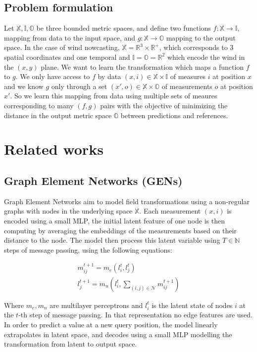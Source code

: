 \documentclass[a4paper,10pt]{article}
\begin{document}
\subsection{Problem formulation}

Let $\mathbb{X}, \mathbb{I}, \mathbb{O}$ be three bounded metric spaces, and define two functions $f : \mathbb{X}\rightarrow \mathbb{I}$, mapping from data to the input space, and $g : \mathbb{X}\rightarrow \mathbb{O}$ mapping to the output space.
In the case of wind nowcasting, $\mathbb{X} = \mathbb{R}^{3} \times \mathbb{R}^{+}$, which corresponds to 3 spatial coordinates and one temporal and $\mathbb{I} = \mathbb{O} = \mathbb{R}^{2}$ which encode the wind in the $(x,y)$ plane.
We want to learn the transformation which maps a function $f$ to $g$.
We only have access to $f$ by data $(x, i)  \in \mathbb{X} \times \mathbb{I}$ of measures $i$ at position $x$ and we know $g$ only through a set $(x', o) \in \mathbb{X} \times \mathbb{O}$ of measurements $o$ at position $x'$.
So we learn this mapping from data using multiple sets of meaures corresponding to many $(f,g)$ pairs with the objective of minimizing the distance in the output metric space $\mathbb{O}$ between predictions and references.

\section{Related works}

\subsection{Graph Element Networks (GENs)} \label{ssec:gen}
Graph Element Networks \cite{alet2019gen} aim to model field transformations using a non-regular graphs with nodes in the underlying space $\mathbb{X}$. Each measurement $(x, i)$ is encoded using a small MLP, the initial latent feature of one node is then computing by averaging the embeddings of the measurements based on their distance to the node. The model then process this latent variable using $T \in \mathbb{N}$ steps of message passing, using the following equations:

\begin{align}
  m_{ij}^{t + 1} = m_e(l_{i}^{t}, l_{j}^{t}) \\
  l_{j}^{t + 1} = m_{n}(l_{i}^{t}, \sum_{(i,j) \in \mathcal{N}} m_{ij}^{t + 1})
\end{align}

Where $m_e, m_n$ are multilayer perceptrons and $l_{i}^{t}$ is the latent state of nodes $i$ at the $t$-th step of message passing. In that representation no edge features are used.
In order to predict a value at a new query position, the model linearly extrapolates in latent space, and decodes using a small MLP modelling the transformation from latent to output space.
\end{document}
